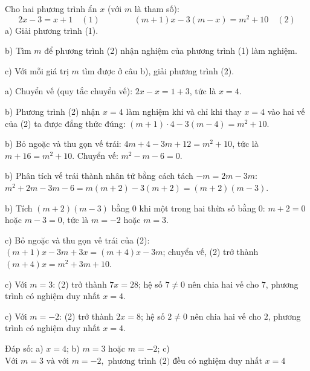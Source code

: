 \begin{problem}[8DS-PT1-009]
Cho hai phương trình ẩn $x$ (với $m$ là tham số):
\[ 2x - 3 = x + 1 \quad (1) \qquad\qquad (m + 1)x - 3(m - x) = m^2 + 10 \quad (2) \]
a) Giải phương trình (1).

b) Tìm $m$ để phương trình (2) nhận nghiệm của phương trình (1) làm nghiệm.

c) Với mỗi giá trị $m$ tìm được ở câu b), giải phương trình (2).

\begin{solution}
a) Chuyển vế (quy tắc chuyển vế): $2x - x = 1 + 3$, tức là $x = 4$.

b) Phương trình (2) nhận $x = 4$ làm nghiệm khi và chỉ khi thay $x = 4$ vào hai vế của (2) ta được đẳng thức đúng: $(m + 1) \cdot 4 - 3(m - 4) = m^2 + 10$.

b) Bỏ ngoặc và thu gọn vế trái: $4m + 4 - 3m + 12 = m^2 + 10$, tức là $m + 16 = m^2 + 10$. Chuyển vế: $m^2 - m - 6 = 0$.

b) Phân tích vế trái thành nhân tử bằng cách tách $-m = 2m - 3m$: $m^2 + 2m - 3m - 6 = m(m + 2) - 3(m + 2) = (m + 2)(m - 3)$.

b) Tích $(m + 2)(m - 3)$ bằng $0$ khi một trong hai thừa số bằng $0$: $m + 2 = 0$ hoặc $m - 3 = 0$, tức là $m = -2$ hoặc $m = 3$.

c) Bỏ ngoặc và thu gọn vế trái của (2): $(m + 1)x - 3m + 3x = (m + 4)x - 3m$; chuyển vế, (2) trở thành $(m + 4)x = m^2 + 3m + 10$.

c) Với $m = 3$: (2) trở thành $7x = 28$; hệ số $7 \neq 0$ nên chia hai vế cho $7$, phương trình có nghiệm duy nhất $x = 4$.

c) Với $m = -2$: (2) trở thành $2x = 8$; hệ số $2 \neq 0$ nên chia hai vế cho $2$, phương trình có nghiệm duy nhất $x = 4$.

Đáp số: a) $\boxed{x = 4}$; b) $\boxed{m = 3 \text{ hoặc } m = -2}$; c) $\boxed{\text{Với } m = 3 \text{ và với } m = -2, \text{ phương trình (2) đều có nghiệm duy nhất } x = 4}$
\end{solution}
\end{problem}

